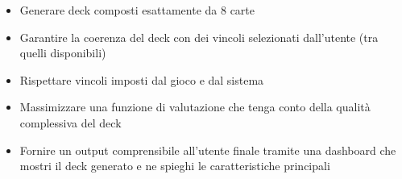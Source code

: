 \documentclass{article}
\begin{document}
\begin{itemize}
  \item Generare deck composti esattamente da 8 carte 
  \item Garantire la coerenza del deck con dei vincoli selezionati dall’utente (tra quelli disponibili)
  \item Rispettare vincoli imposti dal gioco e dal sistema
  \item Massimizzare una funzione di valutazione che tenga conto della qualità complessiva del deck 
  \item Fornire un output comprensibile all’utente finale tramite una dashboard che mostri il deck generato e ne spieghi le caratteristiche principali
\end{itemize}
\end{document}
